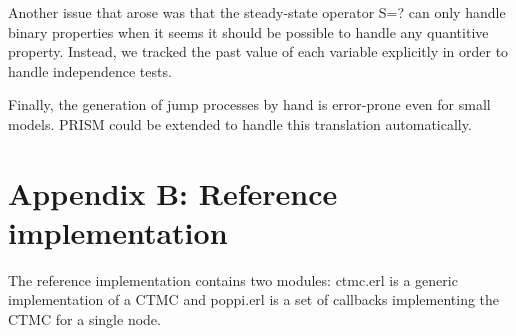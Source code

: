 \documentclass[a4paper,10pt]{article}
\newcommand{\code}[1]{
  \footnotesize
  
}
\begin{document}
Another issue that arose was that the steady-state operator S=? can only handle binary properties when it seems it should be possible to handle any quantitive property. Instead, we tracked the past value of each variable explicitly in order to handle independence tests. 

Finally, the generation of jump processes by hand is error-prone even for small models. PRISM could be extended to handle this translation automatically.

\clearpage

\section*{Appendix B: Reference implementation}

The reference implementation contains two modules: ctmc.erl is a generic implementation of a CTMC and poppi.erl is a set of callbacks implementing the CTMC for a single node.

\clearpage
\code{../src/ctmc.erl}
\clearpage
\code{../src/poppi.erl}
\end{document}
